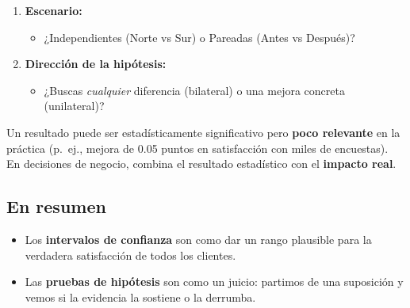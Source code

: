 \documentclass[
  spanish,
  letterpaper,
  DIV=11,
  numbers=noendperiod]{scrreprt}
\providecommand{\tightlist}{%
  \setlength{\itemsep}{0pt}\setlength{\parskip}{0pt}}
\begin{document}
\begin{enumerate}
\def\labelenumi{\arabic{enumi}.}
\tightlist
\item
  \textbf{Escenario:}

  \begin{itemize}
  \tightlist
  \item
    ¿Independientes (Norte vs Sur) o Pareadas (Antes vs Después)?
  \end{itemize}
\item
  \textbf{Dirección de la hipótesis:}

  \begin{itemize}
  \tightlist
  \item
    ¿Buscas \emph{cualquier} diferencia (bilateral) o una mejora
    concreta (unilateral)?
  \end{itemize}
\end{enumerate}

\begin{tcolorbox}[enhanced jigsaw, toptitle=1mm, opacitybacktitle=0.6, leftrule=.75mm, arc=.35mm, title=\textcolor{quarto-callout-tip-color}{\faLightbulb}\hspace{0.5em}{Estadísticamente vs.~prácticamente significativo}, colback=white, bottomrule=.15mm, colbacktitle=quarto-callout-tip-color!10!white, opacityback=0, bottomtitle=1mm, breakable, rightrule=.15mm, coltitle=black, left=2mm, titlerule=0mm, colframe=quarto-callout-tip-color-frame, toprule=.15mm]

Un resultado puede ser estadísticamente significativo pero \textbf{poco
relevante} en la práctica (p.~ej., mejora de 0.05 puntos en satisfacción
con miles de encuestas).\\
En decisiones de negocio, combina el resultado estadístico con el
\textbf{impacto real}.

\end{tcolorbox}

\subsection{En resumen}\label{en-resumen}

\begin{itemize}
\item
  Los \textbf{intervalos de confianza} son como dar un rango plausible
  para la verdadera satisfacción de todos los clientes.
\item
  Las \textbf{pruebas de hipótesis} son como un juicio: partimos de una
  suposición y vemos si la evidencia la sostiene o la derrumba.
\end{itemize}
\end{document}
